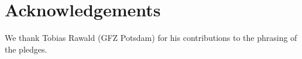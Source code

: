 \documentclass[a4paper,UKenglish]{dagman}
\begin{document}
\section*{Acknowledgements}

We thank Tobias Rawald (GFZ Potsdam) for his contributions to the phrasing of the pledges.


% 


\end{document}
